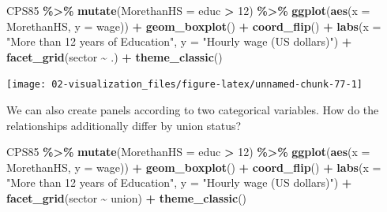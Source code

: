 \documentclass[
]{book}
\newenvironment{Shaded}{\begin{snugshade}}{\end{snugshade}}
\newcommand{\AttributeTok}[1]{\textcolor[rgb]{0.13,0.29,0.53}{#1}}
\newcommand{\DecValTok}[1]{\textcolor[rgb]{0.00,0.00,0.81}{#1}}
\newcommand{\FunctionTok}[1]{\textcolor[rgb]{0.13,0.29,0.53}{\textbf{#1}}}
\newcommand{\NormalTok}[1]{#1}
\newcommand{\SpecialCharTok}[1]{\textcolor[rgb]{0.81,0.36,0.00}{\textbf{#1}}}
\newcommand{\StringTok}[1]{\textcolor[rgb]{0.31,0.60,0.02}{#1}}
\begin{document}
\begin{Shaded}
\begin{Highlighting}[]
\NormalTok{CPS85 }\SpecialCharTok{\%\textgreater{}\%}
    \FunctionTok{mutate}\NormalTok{(}\AttributeTok{MorethanHS =}\NormalTok{ educ }\SpecialCharTok{\textgreater{}} \DecValTok{12}\NormalTok{) }\SpecialCharTok{\%\textgreater{}\%} 
    \FunctionTok{ggplot}\NormalTok{(}\FunctionTok{aes}\NormalTok{(}\AttributeTok{x =}\NormalTok{ MorethanHS, }\AttributeTok{y =}\NormalTok{ wage)) }\SpecialCharTok{+}
    \FunctionTok{geom\_boxplot}\NormalTok{() }\SpecialCharTok{+}
    \FunctionTok{coord\_flip}\NormalTok{() }\SpecialCharTok{+} 
    \FunctionTok{labs}\NormalTok{(}\AttributeTok{x =} \StringTok{"More than 12 years of Education"}\NormalTok{, }\AttributeTok{y =} \StringTok{"Hourly wage (US dollars)"}\NormalTok{) }\SpecialCharTok{+}
    \FunctionTok{facet\_grid}\NormalTok{(sector }\SpecialCharTok{\textasciitilde{}}\NormalTok{ .) }\SpecialCharTok{+}
    \FunctionTok{theme\_classic}\NormalTok{()}
\end{Highlighting}
\end{Shaded}

\begin{center}\texttt{[image: 02-visualization\_files/figure-latex/unnamed-chunk-77-1]} \end{center}

We can also create panels according to two categorical variables. How do the relationships additionally differ by union status?

\begin{Shaded}
\begin{Highlighting}[]
\NormalTok{CPS85 }\SpecialCharTok{\%\textgreater{}\%}
    \FunctionTok{mutate}\NormalTok{(}\AttributeTok{MorethanHS =}\NormalTok{ educ }\SpecialCharTok{\textgreater{}} \DecValTok{12}\NormalTok{) }\SpecialCharTok{\%\textgreater{}\%} 
    \FunctionTok{ggplot}\NormalTok{(}\FunctionTok{aes}\NormalTok{(}\AttributeTok{x =}\NormalTok{ MorethanHS, }\AttributeTok{y =}\NormalTok{ wage)) }\SpecialCharTok{+}
    \FunctionTok{geom\_boxplot}\NormalTok{() }\SpecialCharTok{+}
    \FunctionTok{coord\_flip}\NormalTok{() }\SpecialCharTok{+} 
    \FunctionTok{labs}\NormalTok{(}\AttributeTok{x =} \StringTok{"More than 12 years of Education"}\NormalTok{, }\AttributeTok{y =} \StringTok{"Hourly wage (US dollars)"}\NormalTok{) }\SpecialCharTok{+}
    \FunctionTok{facet\_grid}\NormalTok{(sector }\SpecialCharTok{\textasciitilde{}}\NormalTok{ union) }\SpecialCharTok{+}
    \FunctionTok{theme\_classic}\NormalTok{()}
\end{Highlighting}
\end{Shaded}
\end{document}
